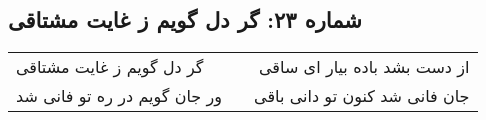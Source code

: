\begin{center}
\section*{شماره ۲۳: گر دل گویم ز غایت مشتاقی}
\label{sec:023}
\begin{longtable}{l p{0.5cm} r}
گر دل گویم ز غایت مشتاقی
&&
از دست بشد باده بیار ای ساقی
\\
ور جان گویم در ره تو فانی شد
&&
جان فانی شد کنون تو دانی باقی
\\
\end{longtable}
\end{center}
